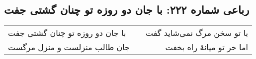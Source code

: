 \begin{center}
\section*{رباعی شماره ۲۲۲: با جان دو روزه تو چنان گشتی جفت}
\label{sec:0222}
\begin{longtable}{l p{0.5cm} r}
با جان دو روزه تو چنان گشتی جفت
&&
با تو سخن مرگ نمی‌شاید گفت
\\
جان طالب منزلست و منزل مرگست
&&
اما خر تو میانهٔ راه بخفت
\\
\end{longtable}
\end{center}
